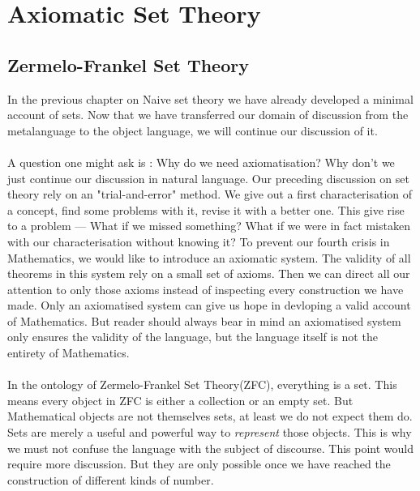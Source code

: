 \chapter{Axiomatic Set Theory}
\section{Zermelo-Frankel Set Theory}
In the previous chapter on Naive set theory we have already developed a minimal account of sets. Now that we have transferred our domain of discussion from the metalanguage to the object language, we will continue our discussion of it.\\
~\\
A question one might ask is : Why do we need axiomatisation? Why don't we just continue our discussion in natural language. Our preceding discussion on set theory rely on an "trial-and-error" method. We give out a first characterisation of a concept, find some problems with it, revise it with a better one. This give rise to a problem --- What if we missed something? What if we were in fact mistaken with our characterisation without knowing it? To prevent our fourth crisis in Mathematics, we would like to introduce an axiomatic system. The validity of all theorems in this system rely on a small set of axioms. Then we can direct all our attention to only those axioms instead of inspecting every construction we have made. Only an axiomatised system can give us hope in devloping a valid account of Mathematics. But reader should always bear in mind an axiomatised system only ensures the validity of the language, but the language itself is not the entirety of Mathematics.\\
~\\
In the ontology of Zermelo-Frankel Set Theory(ZFC), everything is a set. This means every object in ZFC is either a collection or an empty set. But Mathematical objects are not themselves sets, at least we do not expect them do. Sets are merely a useful and powerful way to \textit{represent} those objects. This is why we must not confuse the language with the subject of discourse. This point would require more discussion. But they are only possible once we have reached the construction of different kinds of number.\\

